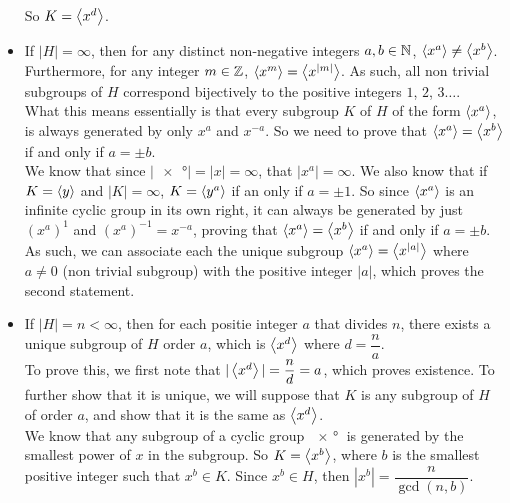 \documentclass[12pt]{article}
\begin{document}
\begin{itemize}[label=$\diamond$]
            So $K = \left\langle x^d \right\rangle$.
        \item 
            If $|H| = \infty$,
            then for any distinct non-negative integers $a,b \in \mathbb{N}$,
            $\left\langle x^a \right\rangle \neq \left\langle x^b \right\rangle$.
            Furthermore, for any integer $m \in \mathbb{Z}$,
            $\left\langle x^m \right\rangle = \left\langle x^{|m|} \right\rangle$.
            As such, all non trivial subgroups of $H$
            correspond bijectively
            to the positive integers $1$, $2$, $3 \dots$. \\
            What this means essentially is that every subgroup $K$
            of $H$ of the form $\left\langle x^a \right\rangle$,
            is always generated by only $x^a$ and $x^{-a}$.
            So we need to prove that $\left\langle x^a \right\rangle = \left\langle x^b \right\rangle$
            if and only if $a = \pm b$. \\
            We know that since $|\ang{x}| = |x| = \infty$,
            that $|x^a| = \infty$.
            We also know that if $K = \left\langle y \right\rangle$ and $|K| = \infty$,
            $K = \left\langle y^a \right\rangle$ if an only if $a = \pm 1$.
            So since $\left\langle x^a \right\rangle$ is an infinite cyclic group
            in its own right,
            it can always be generated by
            just $(x^a)^1$ and $(x^{a})^{-1} = x^{-a}$,
            proving that $\left\langle x^a \right\rangle = \left\langle x^b \right\rangle$
            if and only if $a = \pm b$. \\
            As such, we can associate each the unique subgroup
            $\left\langle x^a \right\rangle = \left\langle x^{|a|} \right\rangle$
            where $a \neq 0$ (non trivial subgroup)
            with the positive integer $|a|$,
            which proves the second statement.
        \item
            If $|H| = n < \infty$,
            then for each positie integer $a$ that divides $n$,
            there exists a unique subgroup of $H$ order $a$,
            which is $\left\langle x^d \right\rangle$ where $d = \dfrac{n}{a}$. \\
            To prove this, 
            we first note that $|\left\langle x^d \right\rangle| = \dfrac{n}{d} = a$,
            which proves existence.
            To further show that it is unique,
            we will suppose that $K$ is any subgroup of $H$
            of order $a$,
            and show that it is the same as $\left\langle x^d \right\rangle$. \\
            We know that any subgroup of a cyclic group $\ang{x}$
            is generated by the smallest power of $x$ in the subgroup.
            So $K = \left\langle x^b \right\rangle$,
            where $b$ is the smallest positive integer such that
            $x^b \in K$.
            Since $x^b \in H$, then $|x^b| = \dfrac{n}{\gcd(n, b)}$.

\end{itemize}
\end{document}
